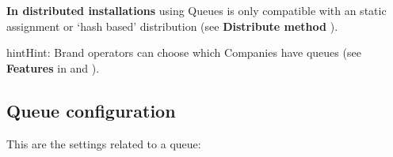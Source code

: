 \documentclass[letterpaper,10pt,english]{sphinxmanual}
\begin{document}
\textbf{In distributed installations} using Queues is only compatible with an static
assignment or `hash based' distribution (see \textbf{Distribute method} {\hyperref[internal_calls/brand_portal:remaining\string-parameters]{}}).

\begin{notice}{hint}{Hint:}
Brand operators can choose which Companies have queues (see \textbf{Features}
in {\hyperref[internal_calls/brand_portal:brand\string-configuration]{}} and {\hyperref[internal_calls/company_portal:company\string-configuration]{}}).
\end{notice}


\subsection{Queue configuration}
\label{pbx_features/queues:queue-configuration}
This are the settings related to a queue:
\end{document}
